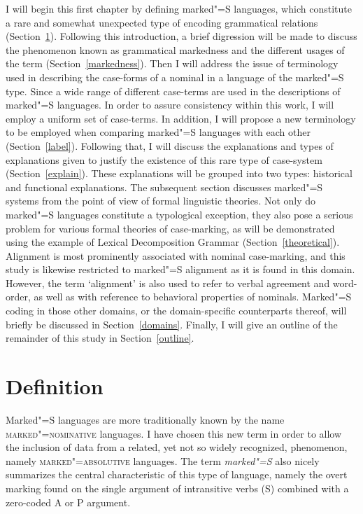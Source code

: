 I will begin this first chapter by defining marked"=S languages, which constitute a rare and somewhat unexpected type of encoding grammatical relations (Section~\ref{definition}). 
Following this introduction, a brief digression will be made to discuss the phenomenon known as grammatical markedness and the different usages of the term (Section~\ref{markedness}). 
Then I will address the issue of terminology used in describing the case-forms of a nominal in a language of the marked"=S type. 
Since a wide range of different case-terms are used in the descriptions of marked"=S languages. 
In order to assure consistency within this work, I will employ a uniform set of case-terms. 
In addition, I will propose a new terminology to be employed when comparing marked"=S languages with each other (Section~\ref{label}). 
Following that, I will discuss the explanations and types of explanations given to justify the existence of this rare type of case-system (Section~\ref{explain}). 
These explanations will be grouped into two types: historical and functional explanations.
The subsequent section discusses marked"=S systems from the point of view of formal linguistic theories. 
Not only do marked"=S languages constitute a typological exception, they also pose a serious problem for various formal theories of case-marking, as will be demonstrated using the example of Lexical Decomposition Grammar (Section~\ref{theoretical}).
Alignment is most prominently associated with nominal case-marking, and this study is likewise restricted to marked"=S alignment as it is found in this domain. 
However, the term `alignment' is also used to refer to verbal agreement and word-order, as well as with reference to behavioral properties of nominals. 
Marked"=S coding in those other domains, or the domain-specific counterparts thereof, will briefly be discussed in Section~\ref{domains}.\enlargethispage{\baselineskip}
Finally, I will give an outline of the remainder of this study in Section~\ref{outline}.


\section{Definition}\label{definition}

Marked"=S languages are more traditionally known by the name \textsc{marked"=nominative} languages. 
I have chosen this new term in order to allow the inclusion of data from a related, yet not so widely recognized, phenomenon, namely \textsc{marked"=absolutive} languages. 
The term \textit{marked"=S} also nicely summarizes the central characteristic of this type of language, namely the overt marking found on the single argument of intransitive verbs (S) combined with a zero-coded A or P argument. 

